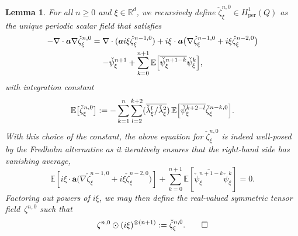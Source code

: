 \documentclass[10pt]{amsart}
\theoremstyle{plain}
\newtheorem{lem0}[theor0]{Lemma}
\newenvironment{lem}
{\renewcommand{\qedsymbol}{$\lozenge$}\pushQED{\qed}\begin{lem0}}
{\popQED\end{lem0}}
\theoremstyle{definition}
\numberwithin{equation}{section}
\newcommand{\R}{\mathbb R}
\newcommand{\per}{{\operatorname{per}}}
\newcommand{\Aa}{\boldsymbol a}
\newcommand{\expec}[1]{\mathbb{E}\left[ #1 \right]}
\newcommand{\Bexpec}[1]{\mathbb{E}\Bigl[ #1 \Bigr]}
\newcommand{\expecm}[1]{\mathbb{E}\bigl[ #1 \bigr]}\let\bexpec\expecm
\begin{document}
\begin{lem}\label{lem:spec-corr-zeta-1}
For all $n\ge0$ and $\xi\in \R^d$, we recursively define $\check\zeta^{n,0}_\xi\in H^1_{{\per}}(Q)$ as the unique periodic scalar field that satisfies
\begin{multline}\label{e.zeta0n}
-\nabla\cdot\Aa\nabla\check \zeta^{n,0}_\xi=\nabla\cdot(\Aa i\xi\check\zeta^{n-1,0}_\xi)
+i\xi\cdot\Aa\big(\nabla\check\zeta^{n-1,0}_\xi+i\xi\check\zeta^{n-2,0}_\xi\big)\\
-\check\psi^{n+1}_\xi+\sum_{k=0}^{n+1}\Bexpec{\overline{\check\psi^{n+1-k}_\xi}\check\psi^k_\xi},
\end{multline}
with integration constant\vspace*{-3pt}
\begin{equation}\label{eq:expec-zeta}
\expecm{\check \zeta^{n,0}_\xi}:=-\sum_{k=1}^{n}\sum_{l=2}^{k+2}(\overline{\check \lambda_\xi^l/\check \lambda_\xi^2})\,\Bexpec{\overline{\check\psi^{k+2-l}_\xi}\check\zeta^{n-k,0}_\xi}.
\end{equation}
With this choice of the constant, the above equation for $\check\zeta^{n,0}_\xi$ is indeed well-posed by the Fredholm alternative as it iteratively ensures that the right-hand side has vanishing average,\vspace*{-3pt}
\begin{equation}\label{eq:chocolate}
\expec{i\xi\cdot\Aa\big(\nabla\check\zeta^{n-1,0}_\xi+i\xi\check\zeta^{n-2,0}_\xi\big)}+\sum_{k=0}^{n+1}\expec{\overline{\check\psi^{n+1-k}_\xi}\check\psi^k_\xi}=0.
\end{equation}
{Factoring out powers of $i\xi$,} we may then define the real-valued symmetric tensor field~$\zeta^{n,0}$ such that\vspace*{-3pt}
\[\zeta^{n,0} \odot (i\xi)^{\otimes (n+1)}:= \check\zeta^{n,0}_{\xi}.\qedhere\]
\end{lem}
\end{document}
